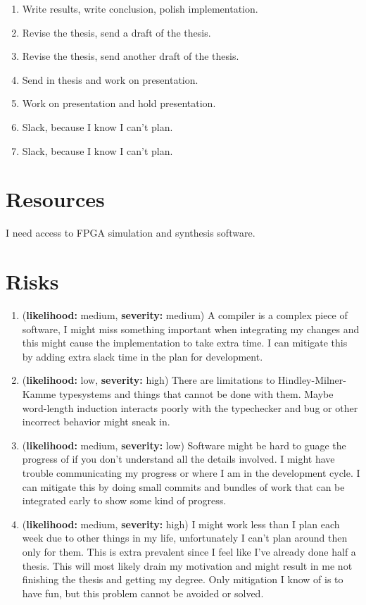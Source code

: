 \documentclass[msc,lith,english]{liuthesis}
\begin{document}
\begin{enumerate}
  \item \futr Write results, write conclusion, polish implementation.  
  \item \futr Revise the thesis, send a draft of the thesis.
  \item \futr Revise the thesis, send another draft of the thesis.
  \item \futr Send in thesis and work on presentation.  
  \item \futr Work on presentation and hold presentation.  
  \item \futr Slack, because I know I can't plan.
  \item \futr Slack, because I know I can't plan.
\end{enumerate}

\section{Resources}
I need access to FPGA simulation and synthesis software.

\section{Risks}

\newcommand{\riskHeader}[2]{(\textbf{likelihood:} #1, \textbf{severity:} #2)}
\begin{enumerate}
  \item \riskHeader{medium}{medium} A compiler is a complex piece of software, I might miss something important when integrating my changes and this might cause the implementation to take extra time. I can mitigate this by adding extra slack time in the plan for development.

  \item \riskHeader{low}{high} There are limitations to Hindley-Milner-Kamme typesystems and things that cannot be done with them. Maybe word-length induction interacts poorly with the typechecker and bug or other incorrect behavior might sneak in.

  \item \riskHeader{medium}{low} Software might be hard to guage the progress of if you don't understand all the details involved. I might have trouble communicating my progress or where I am in the development cycle. I can mitigate this by doing small commits and bundles of work that can be integrated early to show some kind of progress.

  \item \riskHeader{medium}{high} I might work less than I plan each week due to other things in my life, unfortunately I can't plan around then only for them. This is extra prevalent since I feel like I've already done half a thesis. This will most likely drain my motivation and might result in me not finishing the thesis and getting my degree. Only mitigation I know of is to have fun, but this problem cannot be avoided or solved.

\end{enumerate}

\printbibliography
\end{document}
